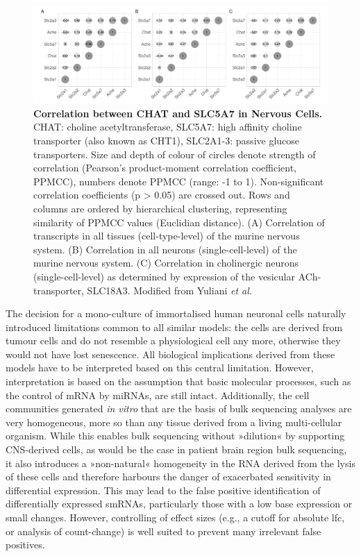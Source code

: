 \begin{figure}
\includegraphics[width=\textwidth]{figures/chat-hacu-corr}
\caption[Correlation between CHAT and SLC5A7 in Nervous Cells.]{\textbf{Correlation between CHAT and SLC5A7 in Nervous Cells.} CHAT: choline acetyltransferase, SLC5A7: high affinity choline transporter (also known as CHT1), SLC2A1-3: passive glucose transporters. Size and depth of colour of circles denote strength of correlation (Pearson’s product-moment correlation coefficient, PPMCC), numbers denote PPMCC (range: -1 to 1). Non-significant correlation coefficients (p > 0.05) are crossed out. Rows and columns are ordered by hierarchical clustering, representing similarity of PPMCC values (Euclidian distance). (A) Correlation of transcripts in all tissues (cell-type-level) of the murine nervous system. (B) Correlation in all neurons (single-cell-level) of the murine nervous system. (C) Correlation in cholinergic neurons (single-cell-level) as determined by expression of the vesicular ACh-transporter, SLC18A3. Modified from Yuliani \emph{et al.}\cite{Yuliani2020}
\label{fig:chat-hacu-corr}}
\end{figure}

The decision for a mono-culture of immortalised human neuronal cells naturally introduced limitations common to all similar models: the cells are derived from tumour cells and do not resemble a physiological cell any more, otherwise they would not have lost senescence. All biological implications derived from these models have to be interpreted based on this central limitation. However, interpretation is based on the assumption that basic molecular processes, such as the control of mRNA by miRNAs, are still intact. Additionally, the cell communities generated \emph{in vitro} that are the basis of bulk sequencing analyses are very homogeneous, more so than any tissue derived from a living multi-cellular organism. While this enables bulk sequencing without »dilution« by supporting CNS-derived cells, as would be the case in patient brain region bulk sequencing, it also introduces a »non-natural« homogeneity in the RNA derived from the lysis of these cells and therefore harbours the danger of exacerbated sensitivity in differential expression. This may lead to the false positive identification of differentially expressed smRNAs, particularly those with a low base expression or small changes. However, controlling of effect sizes (e.g., a cutoff for absolute \acl{lfc}, or analysis of count-change) is well suited to prevent many irrelevant false positives.

